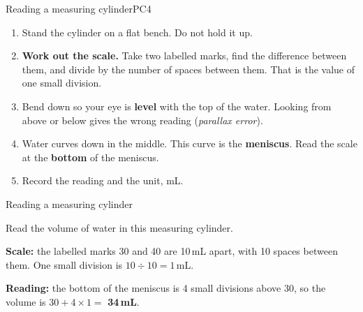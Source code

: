\begin{technique}{Reading a measuring cylinder}{PC4}
\begin{minipage}[c]{0.64\linewidth}
\begin{enumerate}[leftmargin=1.6em, itemsep=1pt, topsep=0pt]
  \item Stand the cylinder on a flat bench. Do not hold it up.
  \item \textbf{Work out the scale.} Take two labelled marks, find the difference between them, and divide by the number of spaces between them. That is the value of one small division.
  \item Bend down so your eye is \textbf{level} with the top of the water. Looking from above or below gives the wrong reading (\emph{parallax error}).
  \item Water curves down in the middle. This curve is the \textbf{meniscus}. Read the scale at the \textbf{bottom} of the meniscus.
  \item Record the reading and the unit, mL.
\end{enumerate}
\end{minipage}\hfill
\begin{minipage}[c]{0.32\linewidth}\centering
{}
\end{minipage}
\end{technique}

\begin{workedex}{Reading a measuring cylinder}
\begin{minipage}[c]{0.64\linewidth}
Read the volume of water in this measuring cylinder.

\smallskip
\textbf{Scale:} the labelled marks 30 and 40 are 10\,mL apart, with 10 spaces between them. One small division is $10 \div 10 = 1$\,mL.

\smallskip
\textbf{Reading:} the bottom of the meniscus is 4 small divisions above 30, so the volume is $30 + 4 \times 1 = $ \textbf{34\,mL}.
\end{minipage}\hfill
\begin{minipage}[c]{0.3\linewidth}\centering
{}
\end{minipage}
\end{workedex}

